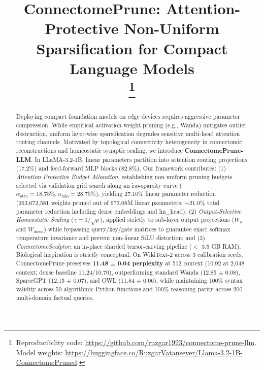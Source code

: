 \documentclass[conference]{IEEEtran}
\begin{document}
\title{ConnectomePrune: Attention-Protective Non-Uniform Sparsification for Compact Language Models\\
\thanks{Reproducibility code: \url{https://github.com/ruzgar1923/connectome-prune-llm}. Model weights: \url{https://huggingface.co/RuzgarVatansever/Llama-3.2-1B-ConnectomePruned}.}
}

\author{
}

\maketitle

\begin{abstract}
Deploying compact foundation models on edge devices requires aggressive parameter compression. While empirical activation-weight pruning (e.g., Wanda) mitigates outlier destruction, uniform layer-wise sparsification degrades sensitive multi-head attention routing channels. Motivated by topological connectivity heterogeneity in connectomic reconstructions and homeostatic synaptic scaling, we introduce \textbf{ConnectomePrune-LLM}. In LLaMA-3.2-1B, linear parameters partition into attention routing projections (17.2\%) and feed-forward MLP blocks (82.8\%). Our framework contributes: (1) \textit{Attention-Protective Budget Allocation}, establishing non-uniform pruning budgets selected via validation grid search along an iso-sparsity curve ($\alpha_{\text{attn}} = 18.75\%, \alpha_{\text{mlp}} = 28.75\%$), yielding 27.10\% linear parameter reduction (263,672,581 weights pruned out of 973.08M linear parameters; $\sim$21.0\% total parameter reduction including dense embeddings and lm\_head); (2) \textit{Output-Selective Homeostatic Scaling} ($\gamma = 1/\sqrt{\rho}$), applied strictly to sub-layer output projections ($W_o$ and $W_{\text{down}}$) while bypassing query/key/gate matrices to guarantee exact softmax temperature invariance and prevent non-linear SiLU distortion; and (3) \textit{ConnectomeSculptor}, an in-place sharded tensor-carving pipeline ($<$ 3.5 GB RAM). Biological inspiration is strictly conceptual. On WikiText-2 across 3 calibration seeds, ConnectomePrune preserves \textbf{11.48 $\pm$ 0.04 perplexity} at 512 context (10.92 at 2,048 context; dense baseline 11.24/10.70), outperforming standard Wanda (12.85 $\pm$ 0.08), SparseGPT (12.15 $\pm$ 0.07), and OWL (11.84 $\pm$ 0.06), while maintaining 100\% syntax validity across 50 algorithmic Python functions and 100\% reasoning parity across 200 multi-domain factual queries.
\end{abstract}
\end{document}
